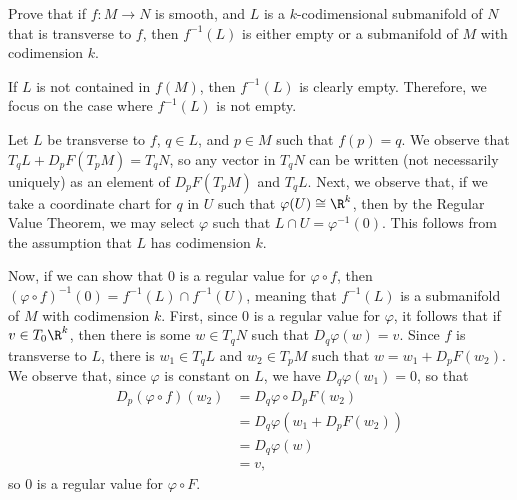 \documentclass[10pt]{mypackage}
\begin{document}
\RaggedRight
\begin{problem}[Problem 1]
  Prove that if $f\colon M\rightarrow N$ is smooth, and $L$ is a $k$-codimensional submanifold of $N$ that is transverse to $f$, then $f^{-1}\left( L \right)$ is either empty or a submanifold of $M$ with codimension $k$.
\end{problem}
\begin{solution}
  If $L$ is not contained in $f(M)$, then $f^{-1}\left( L \right)$ is clearly empty. Therefore, we focus on the case where $f^{-1}\left( L \right)$ is not empty.\newline

  Let $L$ be transverse to $f$, $q\in L$, and $p\in M$ such that $f(p) = q$. We observe that $T_qL + D_pF\left( T_pM \right) = T_qN$, so any vector in $T_qN$ can be written (not necessarily uniquely) as an element of $D_pF\left( T_pM \right)$ and $T_qL$. Next, we observe that, if we take a coordinate chart for $q$ in $U$ such that $\varphi(U)\cong \R^{k}$, then by the Regular Value Theorem, we may select $\varphi$ such that $L\cap U = \varphi^{-1}\left( 0 \right)$. This follows from the assumption that $L$ has codimension $k$.\newline

  Now, if we can show that $0$ is a regular value for $\varphi\circ f$, then $\left( \varphi\circ f \right)^{-1}\left( 0 \right) = f^{-1}\left( L \right)\cap f^{-1}\left( U \right)$, meaning that $f^{-1}\left( L \right)$ is a submanifold of $M$ with codimension $k$. First, since $0$ is a regular value for $\varphi$, it follows that if $v\in T_0\R^{k}$, then there is some $w\in T_{q}N$ such that $D_{q}\varphi\left( w \right) = v$. Since $f$ is transverse to $L$, there is $w_1\in T_qL$ and $w_2\in T_pM$ such that $w = w_1 + D_{p}F\left( w_2 \right)$. We observe that, since $\varphi$ is constant on $L$, we have $D_q\varphi\left( w_1 \right) = 0$, so that
  \begin{align*}
    D_p\left( \varphi\circ f \right)\left( w_2 \right) &= D_q\varphi\circ D_pF\left( w_2 \right)\\
                                                       &= D_q\varphi\left( w_1 + D_pF\left( w_2 \right) \right)\\
                                                       &= D_q\varphi\left( w \right)\\
                                                       &= v,
  \end{align*}
  so $0$ is a regular value for $\varphi\circ F$.
\end{solution}
\end{document}
